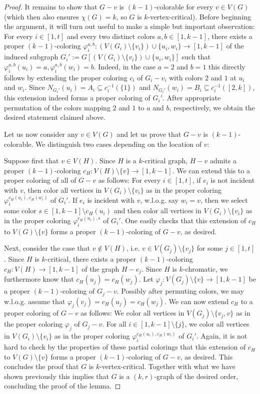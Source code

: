 \documentclass[a4paper,10pt,hidelinks]{amsart}
\renewcommand{\phi}{\ensuremath{\varphi}}
\theoremstyle{definition}
\begin{document}
\begin{proof}
It remains to show that $G-v$ is $(k-1)$-colorable for every $v\in V(G)$ (which then also ensures $\chi(G)=k$, so $G$ is $k$-vertex-critical). Before beginning the argument, it will turn out useful to make a simple but important observation: For every $i\in [1,t]$ and every two distinct colors $a,b\in [1,k-1]$, there exists a proper $(k-1)$-coloring $\phi_i^{a,b}:(V(G_i)\setminus \{v_i\})\cup \{u_i,w_i\}\rightarrow [1,k-1]$ of the induced subgraph $G_i':=G[(V(G_i)\setminus \{v_i\})\cup \{u_i,w_i\}]$ such that $\phi_i^{a,b}(u_i)=a, \phi_i^{a,b}(w_i)=b$. Indeed, in the case $a=2$ and $b=1$ this directly follows by extending the proper coloring $c_i$ of $G_i-v_i$ with colors $2$ and $1$ at $u_i$ and $w_i$. Since $N_{G_i'}(u_i)=A_i\subseteq c_i^{-1}(\{1\})$ and $N_{G_i'}(w_i)=B_i\subseteq c_i^{-1}([2,k])$, this extension indeed forms a proper coloring of $G_i'$. After appropriate permutation of the colors mapping $2$ and $1$ to $a$ and $b$, respectively, we obtain the desired statement claimed above.

Let us now consider any $v\in V(G)$ and let us prove that $G-v$ is $(k-1)$-colorable. We distinguish two cases depending on the location of $v$:

Suppose first that $v\in V(H)$. Since $H$ is a $k$-critical graph, $H-v$ admits a proper $(k-1)$-coloring $c_H:V(H)\setminus \{v\}\rightarrow [1,k-1]$. We can extend this to a proper coloring of all of $G-v$ as follows: For every $i\in [1,t]$, if $e_i$ is not incident with $v$, then color all vertices in $V(G_i)\setminus \{v_i\}$ as in the proper coloring $\phi_i^{c_H(u_i),c_H(w_i)}$ of $G_i'$. If $e_i$ is incident with $v$, w.l.o.g. say $w_i=v$, then we select some color $s\in [1,k-1]\setminus c_H(u_i)$ and then color all vertices in $V(G_i)\setminus \{v_i\}$ as in the proper coloring $\phi_i^{c_H(u_i),s}$ of $G_i'$. One easily checks that this extension of $c_H$ to $V(G)\setminus \{v\}$ forms a proper $(k-1)$-coloring of $G-v$, as desired.

Next, consider the case that $v\notin V(H)$, i.e. $v\in V(G_j)\setminus \{v_j\}$ for some $j\in [1,t]$. Since $H$ is $k$-critical, there exists a proper $(k-1)$-coloring $c_H:V(H)\rightarrow [1,k-1]$ of the graph $H-e_j$. Since $H$ is $k$-chromatic, we furthermore know that $c_H(u_j)=c_H(w_j)$. Let $\phi_j:V(G_j)\setminus \{v\}\rightarrow [1,k-1]$ be a proper $(k-1)$-coloring of $G_j-v$. Possibly after permuting colors, we may w.l.o.g. assume that $\phi_j(v_j)=c_H(u_j)=c_H(w_j)$. We can now extend $c_H$ to a proper coloring of $G-v$ as follows: We color all vertices in $V(G_j)\setminus \{v_j,v\}$ as in the proper coloring $\phi_j$ of $G_j-v$. For all $i\in [1,k-1]\setminus \{j\}$, we color all vertices in $V(G_i)\setminus \{v_i\}$ as in the proper coloring $\phi_i^{c_H(u_i),c_H(w_i)}$ of $G_i'$. Again, it is not hard to check by the properties of these partial colorings that this extension of $c_H$ to $V(G)\setminus \{v\}$ forms a proper $(k-1)$-coloring of $G-v$, as desired. This concludes the proof that $G$ is $k$-vertex-critical. Together with what we have shown previously this implies that $G$ is a $(k,r)$-graph of the desired order, concluding the proof of the lemma.  
\end{proof}
\end{document}
